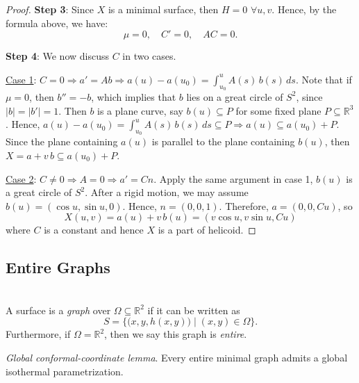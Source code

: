 \begin{proof}
\noindent\textbf{Step 3}: Since $X$ is a minimal surface, then $H = 0$ $\forall u, v$. Hence, by the formula above, we have:
\[
\mu = 0, \quad C' = 0, \quad AC = 0.
\]

\noindent\textbf{Step 4}: We now discuss $C$ in two cases.

\noindent\underline{Case 1}: $C = 0 \Rightarrow a' = Ab \Rightarrow a(u) - a(u_0) = \int_{u_0}^{u}A(s)\,b(s)\,ds$. Note that if $\mu = 0$, then $b'' = -b$, which implies that $b$ lies on a great circle of $S^2$, since $|b| = |b'| = 1$. Then $b$ is a plane curve, say $b(u)\subseteq P$ for some fixed plane $P\subseteq\mathbb{R}^3$. Hence, $a(u) - a(u_0) = \int_{u_0}^{u}A(s)\,b(s)\,ds\subseteq P \Rightarrow a(u)\subseteq a(u_0) + P$. Since the plane containing $a(u)$ is parallel to the plane containing $b(u)$, then $X = a + v\,b\subseteq a(u_0) + P$.

\noindent\underline{Case 2}: $C\neq 0 \Rightarrow A = 0 \Rightarrow a' = Cn$. Apply the same argument in case 1, $b(u)$ is a great circle of $S^2$. After a rigid motion, we may assume $b(u) = (\cos u, \sin u, 0)$. Hence, $n = (0, 0, 1)$. Therefore, $a = (0, 0, Cu)$, so
\[
X(u, v) = a(u) + v\,b(u) = (v\cos u, v\sin u, Cu)
\]
where $C$ is a constant and hence $X$ is a part of helicoid.
\end{proof}

\subsection{Entire Graphs}

\\
A surface is a \textit{graph} over $\Omega\subseteq\mathbb{R}^2$ if it can be written as
\[
S = \big\{\big(x, y, h(x, y)\big) \mid (x, y)\in\Omega\big\}.
\]
Furthermore, if $\Omega = \mathbb{R}^2$, then we say this graph is \textit{entire}.

\begin{lemma}
\textit{Global conformal-coordinate lemma}. Every entire minimal graph admits a global isothermal parametrization.
\end{lemma}

